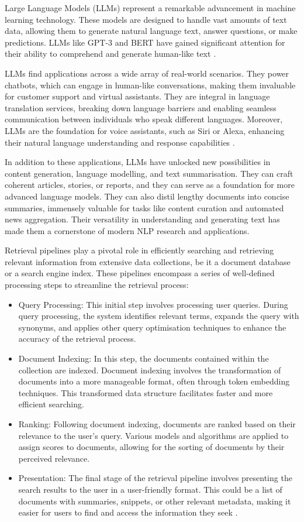 Large Language Models (LLMs) represent a remarkable advancement in machine learning technology. These models are designed to handle vast amounts of text data, allowing them to generate natural language text, answer questions, or make predictions. LLMs like GPT-3 and BERT have gained significant attention for their ability to comprehend and generate human-like text \cite{bert, gpt}.

LLMs find applications across a wide array of real-world scenarios. They power chatbots, which can engage in human-like conversations, making them invaluable for customer support and virtual assistants. They are integral in language translation services, breaking down language barriers and enabling seamless communication between individuals who speak different languages. Moreover, LLMs are the foundation for voice assistants, such as Siri or Alexa, enhancing their natural language understanding and response capabilities \cite{alexa}.

In addition to these applications, LLMs have unlocked new possibilities in content generation, language modelling, and text summarisation. They can craft coherent articles, stories, or reports, and they can serve as a foundation for more advanced language models. They can also distil lengthy documents into concise summaries, immensely valuable for tasks like content curation and automated news aggregation. Their versatility in understanding and generating text has made them a cornerstone of modern NLP research and applications.

Retrieval pipelines play a pivotal role in efficiently searching and retrieving relevant information from extensive data collections, be it a document database or a search engine index. These pipelines encompass a series of well-defined processing steps to streamline the retrieval process:

\begin{itemize}
    \item Query Processing: This initial step involves processing user queries. During query processing, the system identifies relevant terms, expands the query with synonyms, and applies other query optimisation techniques to enhance the accuracy of the retrieval process.
    \item Document Indexing: In this step, the documents contained within the collection are indexed. Document indexing involves the transformation of documents into a more manageable format, often through token embedding techniques. This transformed data structure facilitates faster and more efficient searching.
    \item Ranking: Following document indexing, documents are ranked based on their relevance to the user's query. Various models and algorithms are applied to assign scores to documents, allowing for the sorting of documents by their perceived relevance.
    \item Presentation: The final stage of the retrieval pipeline involves presenting the search results to the user in a user-friendly format. This could be a list of documents with summaries, snippets, or other relevant metadata, making it easier for users to find and access the information they seek \cite{chen, zendel}.
\end{itemize}

